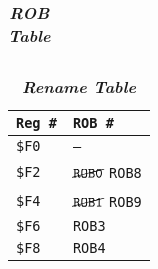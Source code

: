 \begin{enumerate}
\begin{table}[!htp]
\begin{adjustbox}{width={\textwidth},totalheight={\textheight},keepaspectratio}
\begin{tabular}{@{} l l l l l l @{}}
                \bottomrule
            \end{tabular}
        \end{adjustbox}
        \caption*{\emph{\textbf{ROB Table}}}
    \end{table}
    \begin{table}[!htp]
        \centering
        \begin{tabular}{@{} l l @{}}
            \toprule
            \texttt{Reg \#}  & \texttt{ROB \#} \\
            \midrule
            \texttt{\$F0}    & \texttt{--} \\ [.3em]
            \texttt{\$F2}    & $\cancel{\texttt{ROB0}}$ \texttt{ROB8} \\ [.3em]
            \texttt{\$F4}    & $\cancel{\texttt{ROB1}}$ \texttt{ROB9} \\ [.3em]
            \texttt{\$F6}    & \texttt{ROB3} \\ [.3em]
            \texttt{\$F8}    & \texttt{ROB4} \\
            \bottomrule
        \end{tabular}
        \caption*{\emph{\textbf{Rename Table}}}
    \end{table}
\end{enumerate}
